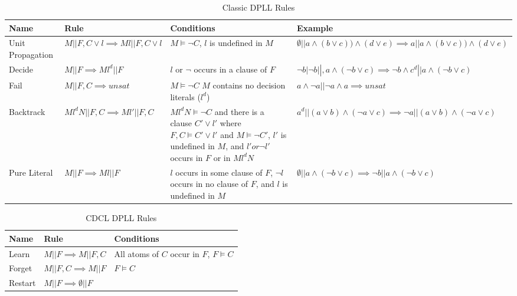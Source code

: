 \documentclass[]{final_report}
\begin{document}
\begin{table}[t]
\begin{tabular}{|p{2cm}|p{4cm}|p{4cm}|p{4cm}|}
\hline
Name & Rule & Conditions & Example \\ \hline
Unit Propagation & $M|| F, C \lor l \implies M l || F, C \lor l$ & ​$M \models \lnot C $, $l$ is undefined in $M$ & $\emptyset || a \land (b \lor c) ) \land (d \lor e) \implies a || a \land (b \lor c) ) \land (d \lor e) $ \\ \hline
Decide & $M|| F \implies M l^d || F$ & $l$ or $\lnot$ occurs in a clause of $F$ & $ \lnot b | \lnot b ||, a \land (\lnot b \lor c) \implies\lnot b \land c^d ||a \land (\lnot b \lor c) $ \\ \hline
Fail & $M|| F, C \implies unsat$ & $M \models \lnot C$ $M$ contains no decision literals ($l^d$) & $ a \land \lnot a || \lnot a \land a \implies unsat $ \\ \hline
Backtrack & $M l^d N|| F, C \implies M l' || F, C$ & $M l^d N \models \lnot C$ and there is a clause $C' \lor l'$ where $F, C \models C' \lor l'$ and $M \models \lnot C'$, $l'$ is undefined in $M$, and $l' or \lnot l'$ occurs in $F$ or in $M l^d N$ & $a^d || (a \lor b) \land (\lnot{a} \lor c) \implies \lnot{a} || (a \lor b) \land (\lnot{a} \lor c)$  \\ \hline
Pure Literal & $M|| F \implies Ml || F$ & $l$ occurs in some clause of $F$, $\lnot l$ occurs in no clause of $F$, and $l$ is undefined in $M$ & $\emptyset || a \land (\lnot b \lor c) \implies \lnot b || a \land (\lnot b \lor c) $ \\ \hline
\end{tabular}
\caption{Classic DPLL Rules}
\label{table:classic-dpll-rules}
\end{table}


\begin{table}[t]
\centering
\begin{tabular}{|p{2cm}|p{5.5cm}|p{5.5cm}}
\hline
Name & Rule & Conditions  \\ \hline
Learn & $M|| F \implies M || F, C$ & All atoms of $C$ occur in $F$, $F \models C$  \\ \hline
Forget & $M|| F, C \implies M || F $ & $F \models C$  \\ \hline
Restart & $M|| F \implies \emptyset || F$ &  \\ \hline
\end{tabular}
\caption{CDCL DPLL Rules}
\label{table:cdcl-rules}
\end{table}
\end{document}
